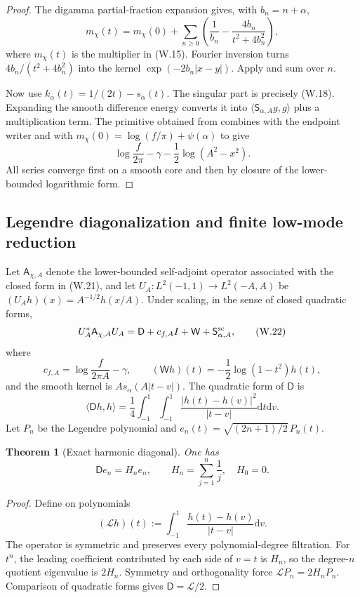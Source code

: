 \documentclass[11pt]{article}
\newtheorem{theorem}{Theorem}[section]
\theoremstyle{definition}
\theoremstyle{remark}
\newcommand{\dd}{\mathrm d}
\begin{document}
\begin{proof}
The digamma partial-fraction expansion gives, with $b_n=n+\alpha$,
\[
 m_\chi(t)
 =m_\chi(0)+\sum_{n\ge0}
 \left(\frac1{b_n}-\frac{4b_n}{t^2+4b_n^2}\right),
\]
where
$m_\chi(t)$ is the multiplier in \textup{(W.15)}.  Fourier inversion turns
$4b_n/(t^2+4b_n^2)$ into the kernel
$\exp(-2b_n|x-y|)$.  Apply
 and sum over $n$.

Now use $k_\alpha(t)=1/(2t)-s_\alpha(t)$.  The singular part is precisely
\textup{(W.18)}.  Expanding the smooth difference energy converts it into
$\langle\mathsf S_{\alpha,A}g,g\rangle$ plus a multiplication term.  The
primitive obtained from  combines with the
endpoint writer and with
$m_\chi(0)=\log(f/\pi)+\psi(\alpha)$ to give
\[
 \log\frac f{2\pi}-\gamma-\frac12\log(A^2-x^2).
\]
All series converge first on a smooth core and then by closure of the
lower-bounded logarithmic form.
\end{proof}

\subsection{Legendre diagonalization and finite low-mode reduction}

Let $\mathsf A_{\chi,A}$ denote the lower-bounded self-adjoint operator
associated with the closed form in \textup{(W.21)}, and let
$U_A:L^2(-1,1)\to L^2(-A,A)$ be
$(U_Ah)(x)=A^{-1/2}h(x/A)$.  Under scaling, in the sense of closed
quadratic forms,
\[
 U_A^*\mathsf A_{\chi,A}U_A
 =\mathsf D+c_{f,A}I+\mathsf W
  +\mathsf S_{\alpha,A}^{\rm sc},
 \tag{W.22}
\]
where
\[
 c_{f,A}=\log\frac f{2\pi A}-\gamma,
 \qquad
 (\mathsf Wh)(t)=-\frac12\log(1-t^2)h(t),
\]
and the smooth kernel is
$A s_\alpha(A|t-v|)$.  The quadratic form of $\mathsf D$ is
\[
 \langle\mathsf Dh,h\rangle
 =\frac14\int_{-1}^1\int_{-1}^1
 \frac{|h(t)-h(v)|^2}{|t-v|}\dd t\dd v.
 \tag{W.23}
\]
Let $P_n$ be the Legendre polynomial and
$e_n(t)=\sqrt{(2n+1)/2}\,P_n(t)$.

\begin{theorem}[Exact harmonic diagonal]
\label{thm:weil-Legendre-diagonal}
One has
\[
 \boxed{\mathsf De_n=H_ne_n,}
 \qquad
 H_n=\sum_{j=1}^n\frac1j,
 \quad H_0=0.
 \tag{W.24}
\]
\end{theorem}

\begin{proof}
Define on polynomials
\[
 (\mathcal Lh)(t)
 :=\int_{-1}^1\frac{h(t)-h(v)}{|t-v|}\dd v.
\]
The operator is symmetric and preserves every polynomial-degree filtration.
For $t^n$, the leading coefficient contributed by each side of $v=t$ is
$H_n$, so the degree-$n$ quotient eigenvalue is $2H_n$.  Symmetry and
orthogonality force $\mathcal LP_n=2H_nP_n$.  Comparison of quadratic forms
gives $\mathsf D=\mathcal L/2$.
\end{proof}
\end{document}
